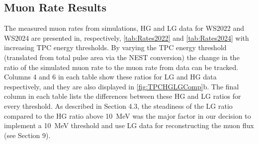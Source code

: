 \subsection{Muon Rate Results}\label{sec:MuonRateResults}
The measured muon rates from simulations, HG and LG data for WS2022 and WS2024 are presented in, respectively, \autoref{tab:Rates2022} and \autoref{tab:Rates2024} with increasing TPC energy thresholds. By varying the TPC energy threshold (translated from total pulse area via the NEST conversion) the change in the ratio of the simulated muon rate to the muon rate from data can be tracked. Columns 4 and 6 in each table show these ratios for LG and HG data respectively, and they are also displayed in \autoref{fig:TPCHGLGComp}b. The final column in each table lists the differences between these HG and LG ratios for every threshold. As described in Section 4.3, the steadiness of the LG ratio compared to the HG ratio above 10~MeV was the major factor in our decision to implement a 10~MeV threshold and use LG data for reconstructing the muon flux (see Section 9).

